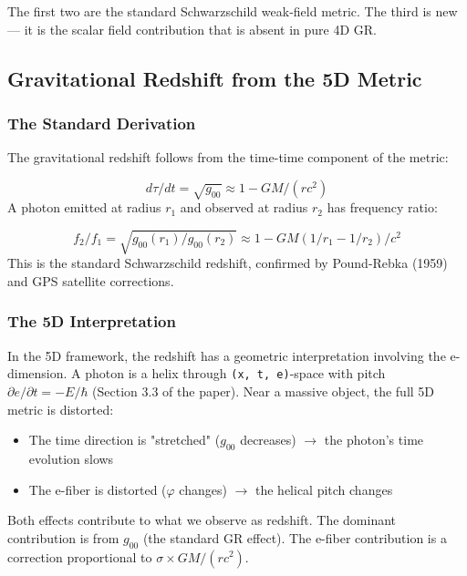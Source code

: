 \documentclass[aps,prd,preprint,superscriptaddress,longbibliography,floatfix]{revtex4-2}
\theoremstyle{remark}
\begin{document}
The first two are the standard Schwarzschild weak-field metric. The third is new --- it is the scalar field contribution that is absent in pure 4D GR.



\subsection{Gravitational Redshift from the 5D Metric}


\subsubsection{The Standard Derivation}

The gravitational redshift follows from the time-time component of the metric:


\begin{equation}
    d\tau/dt = \sqrt{g_{00}} \approx 1 - GM/(rc^{2})
\end{equation}
A photon emitted at radius $r_{1}$ and observed at radius $r_{2}$ has frequency ratio:


\begin{equation}
    f_{2}/f_{1} = \sqrt{g_{00}(r_{1})/g_{00}(r_{2})} \approx 1 - GM(1/r_{1} - 1/r_{2})/c^{2}
\end{equation}
This is the standard Schwarzschild redshift, confirmed by Pound-Rebka (1959) and GPS satellite corrections.


\subsubsection{The 5D Interpretation}

In the 5D framework, the redshift has a geometric interpretation involving the e-dimension. A photon is a helix through \texttt{(x, t, e)}-space with pitch $\partial e/\partial t = -E/\hbar$ (Section 3.3 of the paper). Near a massive object, the full 5D metric is distorted:


\begin{itemize}
  \item The time direction is "stretched" ($g_{00}$ decreases) $\to$ the photon's time evolution slows
  \item The e-fiber is distorted ($\varphi$ changes) $\to$ the helical pitch changes
\end{itemize}

Both effects contribute to what we observe as redshift. The dominant contribution is from $g_{00}$ (the standard GR effect). The e-fiber contribution is a correction proportional to $\sigma \times GM/(rc^{2})$.
\end{document}
